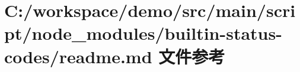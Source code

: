 \hypertarget{node__modules_2builtin-status-codes_2_r_e_a_d_m_e_8md}{}\section{C\+:/workspace/demo/src/main/script/node\+\_\+modules/builtin-\/status-\/codes/readme.md 文件参考}
\label{node__modules_2builtin-status-codes_2_r_e_a_d_m_e_8md}
